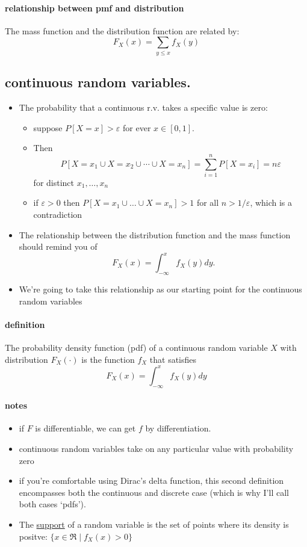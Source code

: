 \paragraph{relationship between pmf and distribution}
\label{sec-3-2-2}

      The mass function and the distribution function are related by:
      \[F_X(x) = \sum_{y \leq x} f_X(y)\]
\subsection{continuous random variables.}
\label{sec-3-3}

\begin{itemize}
\item The probability that a continuous r.v. takes a specific value
       is zero:
\begin{itemize}
\item suppose $P[X = x] > \varepsilon$ for ever $x \in [0,1]$.
\item Then \[P[X=x_1 \cup X = x_2 \cup \cdots \cup X = x_n] =
         \sum_{i=1}^n P[X = x_i] = n \varepsilon\] for distinct $x_1,\dots,x_n$
\item if $\varepsilon > 0$ then $P[X = x_1 \cup \dots \cup X
         = x_n] > 1$ for all $n > 1/\varepsilon$, which is a contradiction
\end{itemize}
\item The relationship between the distribution function and the mass
       function should remind you of \[ F_X(x) = \int_{ -\infty}^{x}
       f_X(y) dy.\]
\item We're going to take this relationship as our starting point for
       the continuous random variables
\end{itemize}
\paragraph{definition}
\label{sec-3-3-1}

      The probability density function (pdf) of a continuous random
      variable $X$ with distribution $F_X(\cdot)$ is the function $f_X$
      that satisfies \[ F_X(x) = \int_{-\infty}^{x} f_X(y) dy\]
\paragraph{notes}
\label{sec-3-3-2}

\begin{itemize}
\item if $F$ is differentiable, we can get $f$ by differentiation.
\item continuous random variables take on any particular value
        with probability zero
\item if you're comfortable using Dirac's delta function, this second
        definition encompasses both the continuous and discrete case
        (which is why I'll call both cases `pdfs').
\item The \underline{support} of a random variable is the set of points where
        its density is positve: $\{x \in \Re \mid f_X(x) > 0\}$
\end{itemize}
